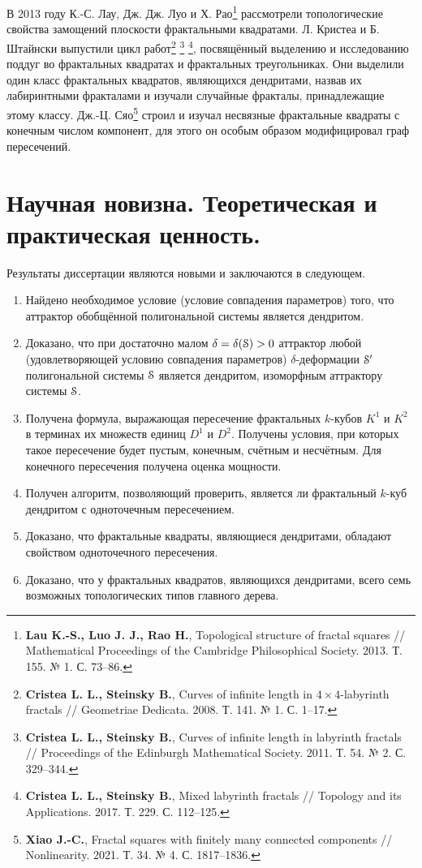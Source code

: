 \documentclass[a5paper,9pt,twoside]{extarticle} %
\begin{document}
В 2013 году К.-С. Лау, Дж. Дж. Луо и Х. Рао\footnote{{\bf Lau K.-S., Luo J. J., Rao H.}, Topological structure of fractal squares // Mathematical Proceedings of the Cambridge Philosophical Society. 2013. Т. 155. № 1. С. 73--86.} рассмотрели топологические свойства замощений плоскости фрактальными квадратами.
Л. Кристеа и Б. Штайнски выпустили цикл работ\footnote{{\bf Cristea L. L., Steinsky B.}, Curves of infinite length in $4\times4$-labyrinth fractals // Geometriae Dedicata. 2008. Т. 141. № 1. С. 1--17.} \footnote{{\bf Cristea L. L., Steinsky B.}, Curves of infinite length in labyrinth fractals // Proceedings of the Edinburgh Mathematical Society. 2011. Т. 54. № 2. С. 329--344.} \footnote{{\bf Cristea L. L., Steinsky B.}, Mixed labyrinth fractals // Topology and its Applications. 2017. Т. 229. С. 112--125.}, посвящённый выделению и исследованию поддуг во фрактальных квадратах и фрактальных треугольниках.
Они выделили один класс фрактальных квадратов, являющихся дендритами, назвав их лабиринтными фракталами и изучали случайные фракталы, принадлежащие этому классу.
Дж.-Ц. Сяо\footnote{{\bf Xiao J.-C.}, Fractal squares with finitely many connected components // Nonlinearity. 2021. Т. 34. № 4. С. 1817--1836.} строил и изучал несвязные фрактальные квадраты с конечным числом компонент, для этого он особым образом модифицировал граф пересечений.



\section{Научная новизна. Теоретическая и практическая ценность.}
Результаты диссертации являются новыми и заключаются в следующем.
\begin{enumerate}
\item Найдено необходимое условие (условие совпадения параметров) того, что аттрактор обобщённой полигональной системы является дендритом. 

\item Доказано, что при достаточно малом $\delta=\delta({\EuScript S})>0$ аттрактор любой (удовлетворяющей условию совпадения параметров) $\delta$-деформации ${\EuScript S}'$  полигональной системы ${\EuScript S}$ является дендритом, изоморфным аттрактору системы ${\EuScript S}$.

\item Получена формула, выражающая пересечение фрактальных $k$-кубов $K^1$ и $K^2$ в терминах их множеств единиц $D^1$ и $D^2$.
Получены условия, при которых такое пересечение будет пустым, конечным, счётным и несчётным.
Для конечного пересечения получена оценка мощности.

\item Получен алгоритм, позволяющий проверить, является ли фрактальный $k$-куб дендритом с одноточечным пересечением.

\item Доказано, что фрактальные квадраты, являющиеся дендритами, обладают свойством одноточечного пересечения.

\item Доказано, что у фрактальных квадратов, являющихся дендритами, всего семь возможных топологических типов главного дерева.
\end{enumerate}
\end{document}
